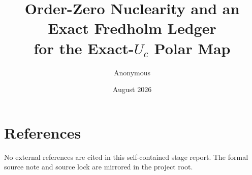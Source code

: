 \documentclass[11pt]{article}
\title{Order-Zero Nuclearity and an Exact Fredholm Ledger\\for the Exact-\(U_c\) Polar Map}
\author{Anonymous}
\date{August 2026}
\begin{document}
\maketitle
\begin{abstract}

\end{abstract}






\appendix

\section*{References}
No external references are cited in this self-contained stage report. The
formal source note and source lock are mirrored in the project root.
\end{document}
